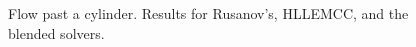 \documentclass[preprint, 11pt]{article}
\begin{document}
\begin{figure}[!h]
{    
  }
  \caption{
    Flow past a cylinder.  Results for Rusanov's, HLLEMCC, and the blended solvers.
    \label{fig:cylinder_flow}}
\end{figure}
\end{document}

